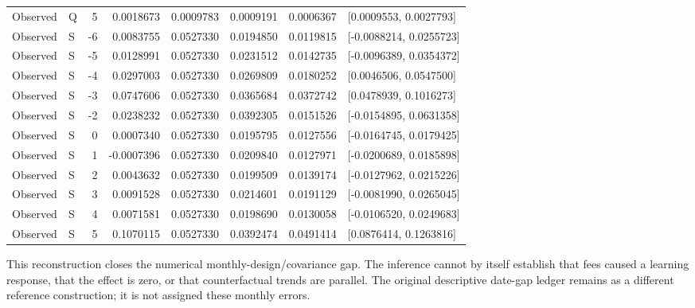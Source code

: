 {\begin{longtable}{llrrrrrl}
Observed & Q & 5 & 0.0018673 & 0.0009783 & 0.0009191 & 0.0006367 & [0.0009553, 0.0027793]\\
Observed & S & -6 & 0.0083755 & 0.0527330 & 0.0194850 & 0.0119815 & [-0.0088214, 0.0255723]\\
Observed & S & -5 & 0.0128991 & 0.0527330 & 0.0231512 & 0.0142735 & [-0.0096389, 0.0354372]\\
Observed & S & -4 & 0.0297003 & 0.0527330 & 0.0269809 & 0.0180252 & [0.0046506, 0.0547500]\\
Observed & S & -3 & 0.0747606 & 0.0527330 & 0.0365684 & 0.0372742 & [0.0478939, 0.1016273]\\
Observed & S & -2 & 0.0238232 & 0.0527330 & 0.0392305 & 0.0151526 & [-0.0154895, 0.0631358]\\
Observed & S & 0 & 0.0007340 & 0.0527330 & 0.0195795 & 0.0127556 & [-0.0164745, 0.0179425]\\
Observed & S & 1 & -0.0007396 & 0.0527330 & 0.0209840 & 0.0127971 & [-0.0200689, 0.0185898]\\
Observed & S & 2 & 0.0043632 & 0.0527330 & 0.0199509 & 0.0139174 & [-0.0127962, 0.0215226]\\
Observed & S & 3 & 0.0091528 & 0.0527330 & 0.0214601 & 0.0191129 & [-0.0081990, 0.0265045]\\
Observed & S & 4 & 0.0071581 & 0.0527330 & 0.0198690 & 0.0130058 & [-0.0106520, 0.0249683]\\
Observed & S & 5 & 0.1070115 & 0.0527330 & 0.0392474 & 0.0491414 & [0.0876414, 0.1263816]\\
\end{longtable}
}
This reconstruction closes the numerical monthly-design/covariance gap. The inference cannot by itself establish that fees caused a learning response, that the effect is zero, or that counterfactual trends are parallel. The original descriptive date-gap ledger remains as a different reference construction; it is not assigned these monthly errors.
